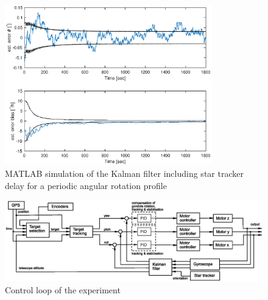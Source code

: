\begin{figure}[htb]
    \centering
    \includegraphics[width = 0.8\textwidth]{4-experiment-design/img/software/kf_10_8_cos_3_1800.eps}
    \caption{MATLAB simulation of the Kalman filter including star tracker delay for a periodic angular rotation profile}
    \label{fig::software::Kalman_filter_delay_2}
\end{figure}

\newpage
\begin{landscape}
    \begin{figure}
        \includegraphics[width=\linewidth]{4-experiment-design/img/software/Control_loop.eps}
        \caption{Control loop of the experiment}
        \label{fig::software::control_loop}
    \end{figure}
\end{landscape}


\raggedbottom
